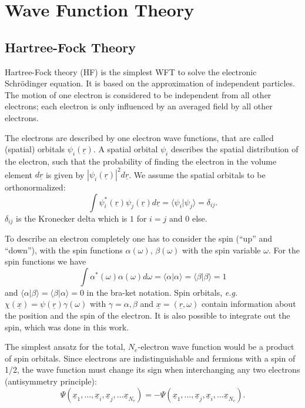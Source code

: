 \documentclass[11pt,DIV=13,BCOR=5mm,a4paper,headinclude]{scrbook}
\renewcommand{\vec}[1]{\underline{#1}}
\begin{document}
\section{Wave Function Theory}
\subsection{Hartree-Fock Theory}
Hartree-Fock theory (HF) is the simplest WFT to solve the electronic Schrödinger equation.
It is based on the approximation of independent particles.
The motion of one electron is considered to be independent from all other electrons; each electron is only influenced by an averaged field by all other electrons.


The electrons are described by one electron wave functions, that are called (spatial) orbitals $\psi_i(\vec{r})$.
A spatial orbital $\psi_i$ describes the spatial distribution of the electron, such that the probability of finding the electron in the volume element $d\vec{r}$ is given by $|\psi_i(\vec{r})|^2d\vec{r}$.
We assume the spatial orbitals to be orthonormalized:
\begin{equation}
\int \psi_i^\ast(\vec{r})\psi_j(\vec{r})d\vec{r}=\langle\psi_i|\psi_j\rangle=\delta_{ij}.
\end{equation}
$\delta_{ij}$ is the Kronecker delta which is $1$ for $i=j$ and $0$ else.


To describe an electron completely one has to consider the spin (``up'' and ``down''), with the spin functions $\alpha(\omega)$, $\beta(\omega)$ with the spin variable $\omega$.
For the spin functions we have
\begin{equation}
\int\alpha^\ast(\omega)\alpha(\omega)d\omega=\langle\alpha|\alpha\rangle=\langle\beta|\beta\rangle=1
\end{equation}
and $\langle\alpha|\beta\rangle=\langle\beta|\alpha\rangle=0$ in the bra-ket notation.
Spin orbitals, \textit{e.g.} $\chi(\vec{x})=\psi(\vec{r})\gamma(\omega)$ with $\gamma=\alpha, \beta$ and $\vec{x}=(\vec{r},\omega)$ contain information about the position and the spin of the electron.
It is also possible to integrate out the spin, which was done in this work.


The simplest ansatz for the total, $N_e$-electron wave function would be a product of spin orbitals.
Since electrons are indistinguishable and fermions with a spin of 1/2, the wave function must change its sign when interchanging any two electrons (antisymmetry principle):
\begin{equation}
\Psi(\vec{x}_1,...,\vec{x}_i,\vec{x}_j,...\vec{x}_{N_e})=-\Psi(\vec{x}_1,...,\vec{x}_j,\vec{x}_i,...\vec{x}_{N_e}).
\end{equation}
\end{document}
